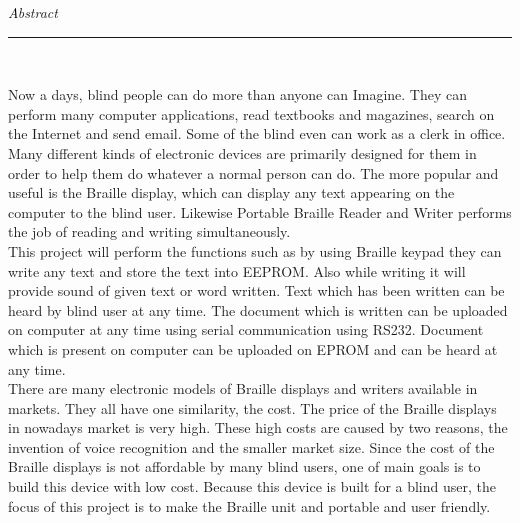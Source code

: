 \thispagestyle{empty}
\begin{flushright}
\textit{\Large \textcolor{black} Abstract}\
\rule{6in}{.1pt}\\[0.5cm]
\end{flushright}
\justifying
\begin{spacing}{1.5}
Now a days, blind people can do more than anyone can Imagine. They can perform many computer applications, read textbooks and magazines, search on the Internet and send email. Some of the blind even can work as a clerk in office. Many different kinds of electronic devices are primarily designed for them in order to help them do whatever a normal person can do. The more popular and useful is the Braille display, which can display any text appearing on the computer to the blind user. Likewise Portable Braille Reader and Writer performs the job of reading and writing simultaneously. \\            
           This project will perform the functions such as  by using Braille keypad they can write any text and store the text into EEPROM. Also while writing it will provide sound of given text or word written. Text which has been written can be heard by blind user at any time. The document which is written can be uploaded on computer at any time using serial communication using RS232. Document which is present on computer can be uploaded on EPROM and can be heard at any time.\\                           
           There are many electronic models of Braille displays and writers available in markets. They all have one similarity, the cost. The price of the Braille displays in nowadays market is very high. These high costs are caused by two reasons, the invention of voice recognition and the smaller market size. Since the cost of the Braille displays is not affordable by many blind users, one of main goals is to build this device with low cost. Because this device  is built for a blind user, the focus of this project is to make the Braille unit and portable and user friendly.
\end{spacing}
